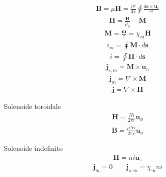\documentclass[10pt, twocolumn, a4paper, fleqn]{article}
\def\bb{\mathbf}
\def\chim{\chi_m}
\def\B{\bb{B}}
\def\H{\bb{H}}
\def\m{\bb{m}}
\def\M{\bb{M}}
\def\j{\bb{j}}
\def\u{\bb{u}}
\def\ds{ d\bb{s}}
\begin{document}
\begin{equation*}\begin{split}
\B=\mu\H=\frac{\mu i}{4\pi}\oint{\frac{\ds\times\u_r}{r^2}}
\end{split}\end{equation*}
\begin{equation*}\begin{split}
\H=\frac{\B}{\mu_0}-\M
\end{split}\end{equation*}
\begin{equation*}\begin{split}
\M=\frac{\m}{\tau}=\chim\H
\end{split}\end{equation*}
\begin{equation*}\begin{split}
i_m=\oint{\M\cdot \ds}
\end{split}\end{equation*}
\begin{equation*}\begin{split}
i=\oint{\H\cdot \ds}
\end{split}\end{equation*}
\begin{equation*}\begin{split}
\j_{s,m}=\M\times\u_n
\end{split}\end{equation*}
\begin{equation*}\begin{split}
\j_{m}=\nabla\times \M
\end{split}\end{equation*}
\begin{equation*}\begin{split}
\j=\nabla \times\H
\end{split}\end{equation*}

Solenoide toroidale
\begin{equation*}\begin{split}
\H=\frac{Ni}{2\pi r}\u_{\phi}
\end{split}\end{equation*}
\begin{equation*}\begin{split}
\B=\frac{\mu Ni}{2\pi r}\u_{\phi}
\end{split}\end{equation*}

Solenoide indefinito
\begin{equation*}\begin{split}
\H=ni\u_z
\end{split}\end{equation*}
\begin{equation*}\begin{split}
\j_m=0 \qquad \j_{s,m}=\chim ni
\end{split}\end{equation*}
\end{document}
